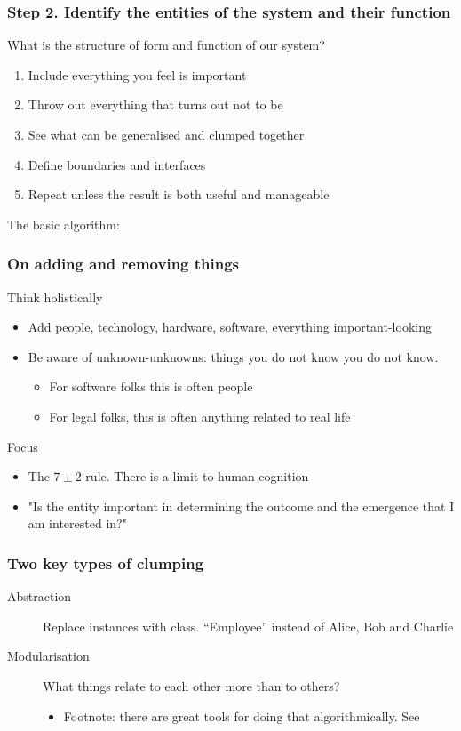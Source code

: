 \documentclass[10pt, compress]{beamer}
\begin{document}
\begin{frame}[fragile]
	\frametitle{Step 2. Identify the entities of the system and their function}
		
	What is the structure of form and function of our system?
	
	\begin{enumerate}
		\item Include everything you feel is important
		\item Throw out everything that turns out not to be 
		\item See what can be generalised and clumped together
		\item Define boundaries and interfaces
		\item Repeat unless the result is both useful and manageable
	\end{enumerate}
	
	The basic algorithm:
	
\end{frame}

\begin{frame}[fragile]
	\frametitle{On adding and removing things}
	
	Think holistically
	\begin{itemize}
		\item Add people, technology, hardware, software, everything important-looking
		\item Be aware of unknown-unknowns: things you do not know you do not know. 
		\begin{itemize}
			\item For software folks this is often people
			\item For legal folks, this is often anything related to real life
		\end{itemize}
	\end{itemize}
	
	Focus
	\begin{itemize}
		\item The $7\pm2$ rule. There is a limit to human cognition \citep{miller1956magical}
		\item "Is the entity important in determining the outcome and the emergence that I am interested in?"
	\end{itemize}
\end{frame}

\begin{frame}[fragile]
	\frametitle{Two key types of clumping}
	\begin{description}
		\item[Abstraction] Replace instances with class. \enquote{Employee} instead of Alice, Bob and Charlie
		\item[Modularisation] What things relate to each other more than to others?
		\begin{itemize}
			\item Footnote: there are great tools for doing that algorithmically. See \cite{browning2001applying}
		\end{itemize}
	\end{description}
\end{frame}
\end{document}
